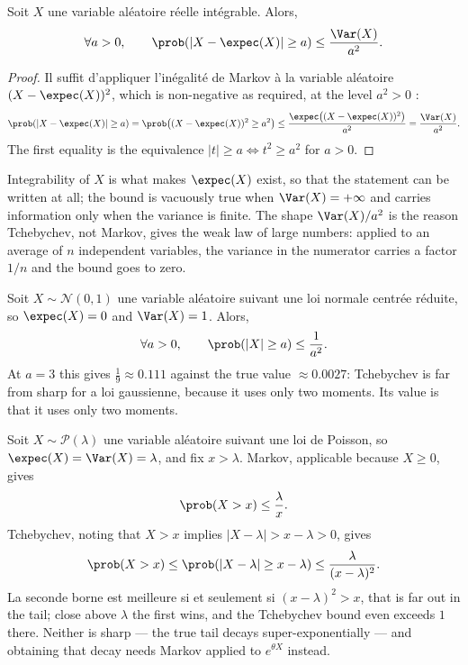 \begin{prop}
  Soit $X$ une variable aléatoire réelle intégrable. Alors,
  \[
    \forall a > 0, \qquad \prob(|X - \expec(X)| \geq a) \leq \frac{\Var(X)}{a^{2}}.
  \]
\end{prop}

\begin{proof}
  Il suffit d'appliquer l'inégalité de Markov à la variable aléatoire
  $(X-\expec(X))^{2}$, which is non-negative as required, at the level
  $a^{2} > 0$ :
  \[
    \prob(|X-\expec(X)| \geq a)
      = \prob\big((X-\expec(X))^{2} \geq a^{2}\big)
      \leq \frac{\expec\big((X-\expec(X))^{2}\big)}{a^{2}}
      = \frac{\Var(X)}{a^{2}} .
  \]
  The first equality is the equivalence $|t| \geq a \iff t^{2} \geq a^{2}$ for
  $a>0$.
\end{proof}

Integrability of $X$ is what makes $\expec(X)$ exist, so that the statement can be
written at all; the bound is vacuously true when $\Var(X) = +\infty$ and carries
information only when the variance is finite. The shape $\Var(X)/a^{2}$ is the
reason Tchebychev, not Markov, gives the weak law of large numbers: applied to an
average of $n$ independent variables, the variance in the numerator carries a
factor $1/n$ and the bound goes to zero.

\begin{example}
  Soit $X \sim \mathcal{N}(0,1)$ une variable aléatoire suivant une loi normale
  centrée réduite, so $\expec(X)=0$ and $\Var(X)=1$. Alors,
  \[
    \forall a > 0, \qquad \prob(|X| \geq a) \leq \frac{1}{a^{2}} .
  \]
  At $a=3$ this gives $\tfrac19 \approx 0.111$ against the true value
  $\approx 0.0027$: Tchebychev is far from sharp for a loi gaussienne, because it
  uses only two moments. Its value is that it uses only two moments.
\end{example}

\begin{example}
  Soit $X \sim \mathcal{P}(\lambda)$ une variable aléatoire suivant une loi de
  Poisson, so $\expec(X)=\Var(X)=\lambda$, and fix $x > \lambda$. Markov,
  applicable because $X \geq 0$, gives
  \[
    \prob(X > x) \leq \frac{\lambda}{x} .
  \]
  Tchebychev, noting that $X > x$ implies $|X-\lambda| > x-\lambda > 0$, gives
  \[
    \prob(X > x) \leq \prob(|X-\lambda| \geq x-\lambda) \leq \frac{\lambda}{(x-\lambda)^{2}} .
  \]
  La seconde borne est meilleure si et seulement si $(x-\lambda)^{2} > x$, that is
  far out in the tail; close above $\lambda$ the first wins, and the Tchebychev
  bound even exceeds $1$ there. Neither is sharp --- the true tail decays
  super-exponentially --- and obtaining that decay needs Markov applied to
  $e^{\theta X}$ instead.
\end{example}

